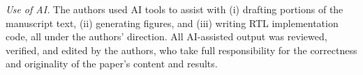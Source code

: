 \ifanon
\else
\fi
\emph{Use of AI.} The authors used AI tools to assist with (i) drafting portions of the manuscript text, (ii) generating figures, and (iii) writing RTL implementation code, all under the authors' direction. All AI-assisted output was reviewed, verified, and edited by the authors, who take full responsibility for the correctness and originality of the paper's content and results.

